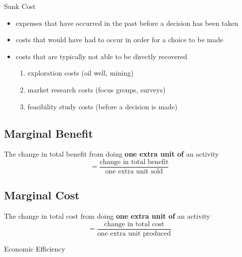 \begin{note}{Sunk Cost}
	\begin{itemize}
		\item expenses that have occurred in the past before a decision has been taken
		\item costs that would have had to occur in order for a choice to be made
		\item costs that are typically not able to be directly recovered
		\begin{enumerate}
			\item exploration costs (oil well, mining)
			\item market research costs (focus groups, surveys)
			\item feasibility study costs (before a decision is made)
		\end{enumerate}
	\end{itemize}
\end{note}

\subsection{Marginal Benefit}
The change in total benefit from doing \textbf{one extra unit of} an activity
$$ = \frac{\text{change in total benefit}}{\text{one extra unit sold}}$$
\subsection{Marginal Cost}
The change in total cost from doing \textbf{one extra unit of} an activity
$$ = \frac{\text{change in total cost}}{\text{one extra unit produced}}$$

\begin{note}{Economic Efficiency}

\end{note}